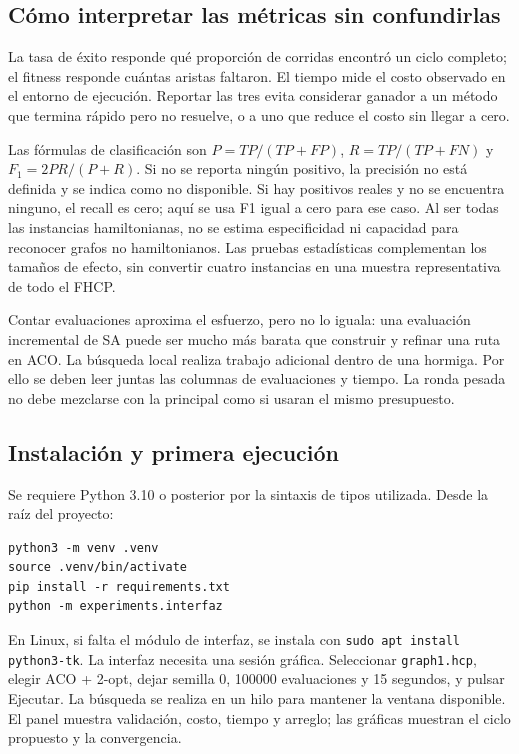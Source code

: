 \documentclass[
  spanish,
  12pt,
]{article}
\begin{document}
\subsection{Cómo interpretar las métricas sin confundirlas}
La tasa de éxito responde qué proporción de corridas encontró un ciclo completo; el fitness responde cuántas aristas faltaron. El tiempo mide el costo observado en el entorno de ejecución. Reportar las tres evita considerar ganador a un método que termina rápido pero no resuelve, o a uno que reduce el costo sin llegar a cero.

Las fórmulas de clasificación son $P=TP/(TP+FP)$, $R=TP/(TP+FN)$ y $F_1=2PR/(P+R)$. Si no se reporta ningún positivo, la precisión no está definida y se indica como no disponible. Si hay positivos reales y no se encuentra ninguno, el recall es cero; aquí se usa F1 igual a cero para ese caso. Al ser todas las instancias hamiltonianas, no se estima especificidad ni capacidad para reconocer grafos no hamiltonianos. Las pruebas estadísticas complementan los tamaños de efecto, sin convertir cuatro instancias en una muestra representativa de todo el FHCP.

Contar evaluaciones aproxima el esfuerzo, pero no lo iguala: una evaluación incremental de SA puede ser mucho más barata que construir y refinar una ruta en ACO. La búsqueda local realiza trabajo adicional dentro de una hormiga. Por ello se deben leer juntas las columnas de evaluaciones y tiempo. La ronda pesada no debe mezclarse con la principal como si usaran el mismo presupuesto.

\subsection{Instalación y primera ejecución}
Se requiere Python 3.10 o posterior por la sintaxis de tipos utilizada. Desde la raíz del proyecto:
\begin{Verbatim}[fontsize=\small,breaklines=true]
python3 -m venv .venv
source .venv/bin/activate
pip install -r requirements.txt
python -m experiments.interfaz
\end{Verbatim}
En Linux, si falta el módulo de interfaz, se instala con \texttt{sudo apt install python3-tk}. La interfaz necesita una sesión gráfica. Seleccionar \texttt{graph1.hcp}, elegir ACO + 2-opt, dejar semilla 0, 100000 evaluaciones y 15 segundos, y pulsar Ejecutar. La búsqueda se realiza en un hilo para mantener la ventana disponible. El panel muestra validación, costo, tiempo y arreglo; las gráficas muestran el ciclo propuesto y la convergencia.
\end{document}

